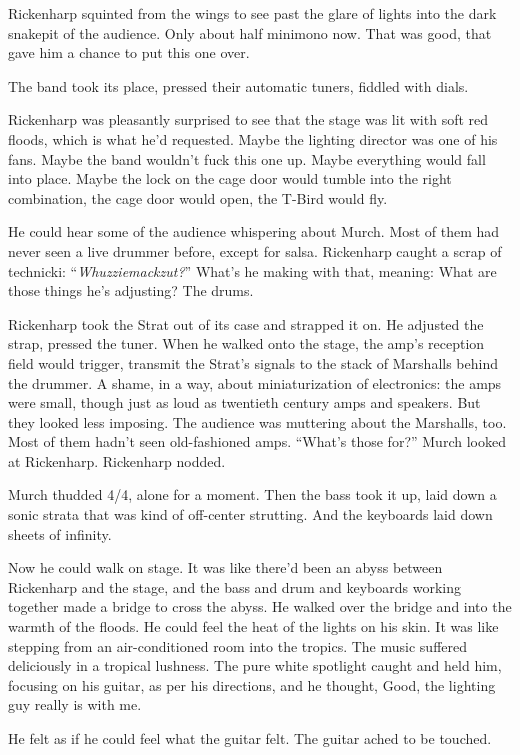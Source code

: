 Rickenharp squinted from the wings to see past the glare of lights into the dark snakepit of the audience. Only about half minimono now. That was good, that gave him a chance to put this one over.

The band took its place, pressed their automatic tuners, fiddled with dials.

Rickenharp was pleasantly surprised to see that the stage was lit with soft red floods, which is what he'd requested. Maybe the lighting director was one of his fans. Maybe the band wouldn't fuck this one up. Maybe everything would fall into place. Maybe the lock on the cage door would tumble into the right combination, the cage door would open, the T-Bird would fly.

He could hear some of the audience whispering about Murch. Most of them had never seen a live drummer before, except for salsa. Rickenharp caught a scrap of technicki: ``\textit{Whuzziemackzut?}'' What's he making with that, meaning: What are those things he's adjusting? The drums.

Rickenharp took the Strat out of its case and strapped it on. He adjusted the strap, pressed the tuner. When he walked onto the stage, the amp's reception field would trigger, transmit the Strat's signals to the stack of Marshalls behind the drummer. A shame, in a way, about miniaturization of electronics: the amps were small, though just as loud as twentieth century amps and speakers. But they looked less imposing. The audience was muttering about the Marshalls, too. Most of them hadn't seen old-fashioned amps. ``What's those for?'' Murch looked at Rickenharp. Rickenharp nodded.

Murch thudded 4/4, alone for a moment. Then the bass took it up, laid down a sonic strata that was kind of off-center strutting. And the keyboards laid down sheets of infinity.

Now he could walk on stage. It was like there'd been an abyss between Rickenharp and the stage, and the bass and drum and keyboards working together made a bridge to cross the abyss. He walked over the bridge and into the warmth of the floods. He could feel the heat of the lights on his skin. It was like stepping from an air-conditioned room into the tropics. The music suffered deliciously in a tropical lushness. The pure white spotlight caught and held him, focusing on his guitar, as per his directions, and he thought, Good, the lighting guy really is with me.

He felt as if he could feel what the guitar felt. The guitar ached to be touched.

